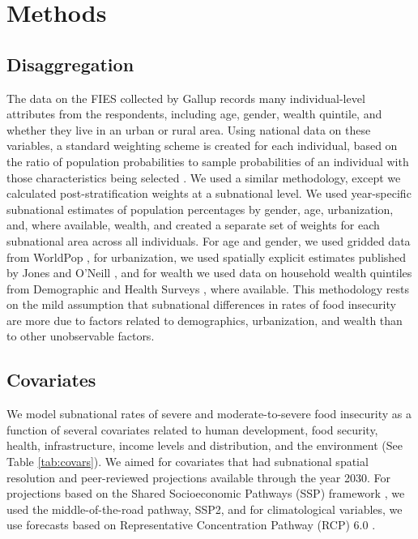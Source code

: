 \documentclass{article}
\begin{document}
\section{Methods}


\subsection{Disaggregation}
The data on the FIES collected by Gallup records many individual-level attributes from the respondents, including age, gender, wealth quintile, and whether they live in an urban or rural area.  Using national data on these variables, a standard weighting scheme is created for each individual, based on the ratio of population probabilities to sample probabilities of an individual with those characteristics being selected \citep{bethlehem2009applied}.  We used a similar methodology, except we calculated post-stratification weights at a subnational level.  We used year-specific subnational estimates of population percentages by gender, age, urbanization, and, where available, wealth, and created a separate set of weights for each subnational area across all individuals.  For age and gender, we used gridded data from WorldPop \citep{Tatem2017}, for urbanization, we used spatially explicit estimates published by Jones and O'Neill \citep{Jones2016}, and for wealth we used data on household wealth quintiles from Demographic and Health Surveys \citep{dhsall}, where available.  This methodology rests on the mild assumption that subnational differences in rates of food insecurity are more due to factors related to demographics, urbanization, and wealth than to other unobservable factors.

\subsection{Covariates}
We model subnational rates of severe and moderate-to-severe food insecurity as a function of several covariates related to human development, food security, health, infrastructure, income levels and distribution, and the environment (See Table \ref{tab:covars}).  We aimed for covariates that had subnational spatial resolution and peer-reviewed projections available through the year 2030.   For projections based on the Shared Socioeconomic Pathways (SSP) framework \citep{oneill2014new}, we used the middle-of-the-road pathway, SSP2, and for climatological variables, we use forecasts based on Representative Concentration Pathway (RCP) 6.0 \citep{van2011representative}.  
\end{document}
